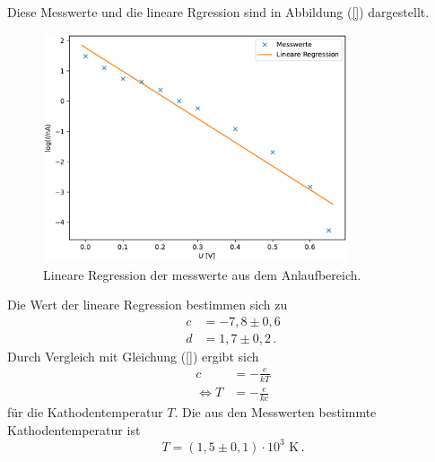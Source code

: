 Diese Messwerte und die lineare Rgression sind in Abbildung (\ref{}) dargestellt. 
\begin{figure}
    \centering
    \includegraphics[width=0.8\textwidth]{plot_4.pdf}
    \caption{Lineare Regression der messwerte aus dem Anlaufbereich.}
    \label{fig:plot_3}
\end{figure}
Die Wert der lineare Regression bestimmen sich zu 
\begin{align*}
    c &= -7,8 \pm 0,6 \\
    d &= 1,7 \pm 0,2 \, .
\end{align*}
Durch Vergleich mit Gleichung (\ref{}) ergibt sich 
\begin{align*}
    c &= -\frac{e}{kT} \\
    \Leftrightarrow T &= -\frac{e}{kc}
\end{align*}
für die Kathodentemperatur $T$. 
Die aus den Messwerten bestimmte Kathodentemperatur ist 
$$ T = (1,5 \pm 0,1)\cdot 10^{3} \, \, \unit{\kelvin}\,.$$

